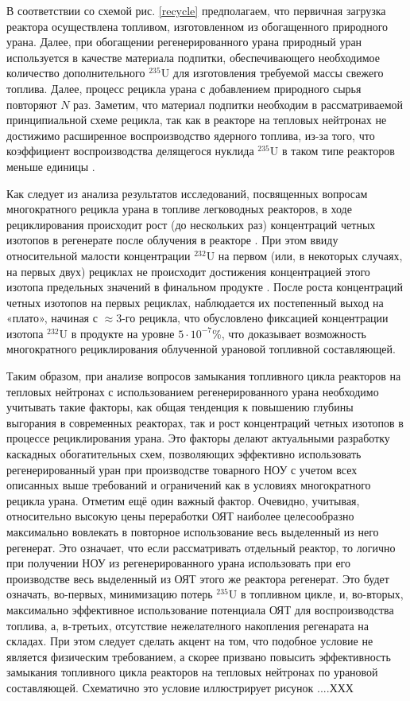 В соответствии со схемой рис. \ref{recycle} предполагаем, что первичная загрузка реактора осуществлена топливом, изготовленном из обогащенного природного урана. Далее, при обогащении регенерированного урана природный уран используется в качестве материала подпитки, обеспечивающего необходимое количество дополнительного $^{235}$U для изготовления требуемой массы свежего топлива. Далее, процесс рецикла урана с добавлением природного сырья повторяют $N$ раз. Заметим, что материал подпитки необходим в рассматриваемой принципиальной схеме рецикла, так как в реакторе на тепловых нейтронах не достижимо расширенное воспроизводство ядерного топлива, из-за того, что коэффициент воспроизводства делящегося нуклида $^{235}$U в таком типе реакторов меньше единицы \cite{ignatevVliyanieVidaTopliva2020}. 


Как следует из анализа результатов исследований, посвященных вопросам многократного рецикла урана в топливе легководных реакторов, в ходе рециклирования происходит рост (до нескольких раз) концентраций четных изотопов в регенерате после облучения в реакторе \cite{smirnovEvolutionIsotopicComposition2012}. При этом ввиду относительной малости концентрации $^{232}$U на первом (или, в некоторых случаях, на первых двух) рециклах не происходит достижения концентрацией этого изотопа предельных значений в финальном продукте \cite{smirnovApplyingEnrichmentCapacities2018}.
После роста концентраций четных изотопов на первых рециклах, наблюдается их постепенный выход на «плато», начиная с $\approx$3-го рецикла, что обусловлено фиксацией концентрации изотопа $^{232}$U в продукте на уровне $5\cdot10^{-7}$\%, что доказывает возможность многократного рециклирования облученной урановой топливной составляющей.

Таким образом, при анализе вопросов замыкания топливного цикла реакторов на тепловых нейтронах с использованием регенерированного урана необходимо учитывать такие факторы, как общая тенденция к повышению глубины выгорания в современных реакторах, так и рост концентраций четных изотопов в процессе рециклирования урана. Это факторы делают актуальными разработку каскадных обогатительных схем, позволяющих эффективно использовать регенерированный уран при производстве товарного НОУ с учетом всех описанных выше требований и ограничений как в условиях многократного рецикла урана.
Отметим ещё один важный фактор. Очевидно, учитывая, относительно высокую цены переработки ОЯТ наиболее целесообразно максимально вовлекать в повторное использование весь выделенный из него регенерат. Это означает, что если рассматривать отдельный реактор, то логично при получении НОУ из регенерированного урана использовать при его производстве весь выделенный из ОЯТ этого же реактора регенерат. Это будет означать, во-первых, минимизацию потерь $^{235}$U в топливном цикле, и, во-вторых, максимально эффективное использование потенциала ОЯТ для воспроизводства топлива, а, в-третьих, отсутствие нежелателного накопления регенарата на складах. При этом следует сделать акцент на том, что подобное условие не является физическим требованием, а скорее призвано повысить эффективность замыкания топливного цикла реакторов на тепловых нейтронах по урановой составляющей. Схематично это условие иллюстрирует рисунок ....ХХХ


